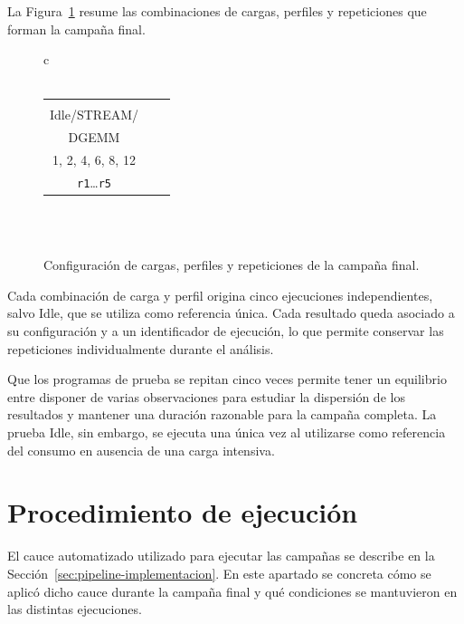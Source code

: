 La Figura~\ref{fig:campania-experimental} resume las combinaciones de cargas, perfiles y repeticiones que forman la campaña final.

\begin{figure}[htbp]
\centering
\begin{tabular}{c}
 \\[3pt]
\diagramdown \\[3pt]
\begin{tabular}{c@{\hspace{0.25cm}}c@{\hspace{0.25cm}}c}
\diagramnode[0.22\textwidth]{Carga\\Idle/STREAM/\\DGEMM} &
\diagramnode[0.22\textwidth]{Perfil\\1, 2, 4, 6, 8, 12} &
\diagramnode[0.22\textwidth]{Repetición\\\texttt{r1}\ldots\texttt{r5}}
\end{tabular} \\[3pt]
\diagramdown \\[3pt]
\end{tabular}
\caption{Configuración de cargas, perfiles y repeticiones de la campaña final.}
\label{fig:campania-experimental}
\end{figure}

Cada combinación de carga y perfil origina cinco ejecuciones independientes, salvo Idle, que se utiliza como referencia única. Cada resultado queda asociado a su configuración y a un identificador de ejecución, lo que permite conservar las repeticiones individualmente durante el análisis.

Que los programas de prueba se repitan cinco veces permite tener un equilibrio entre disponer de varias observaciones para estudiar la dispersión de los resultados y mantener una duración razonable para la campaña completa. La prueba Idle, sin embargo, se ejecuta una única vez al utilizarse como referencia del consumo en ausencia de una carga intensiva.

\section{Procedimiento de ejecución}
\label{sec:procedimiento-diseno-experimental}

El cauce automatizado utilizado para ejecutar las campañas se describe en la Sección~\ref{sec:pipeline-implementacion}. En este apartado se concreta cómo se aplicó dicho cauce durante la campaña final y qué condiciones se mantuvieron en las distintas ejecuciones.


